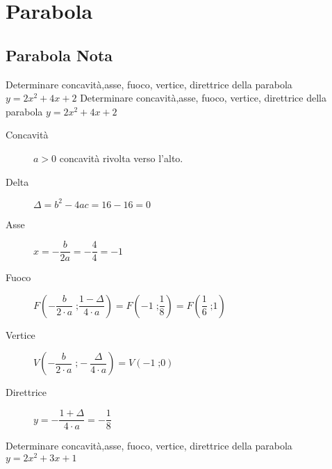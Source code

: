 \chapter{Parabola}
\section{Parabola Nota}
 \begin{exercise}
	Determinare concavità,asse, fuoco, vertice, direttrice della parabola $y=2x^2+4x+2$
	\tcblower
	Determinare concavità,asse, fuoco, vertice, direttrice della parabola $y=2x^2+4x+2$
	\begin{description}
		\item[Concavità] $a>0$ concavità rivolta verso l'alto.
		\item[Delta] $\Delta=b^2-4ac=16-16=0$
		\item[Asse] $x=-\dfrac{b}{2a}=-\dfrac{4}{4}=-1$
		\item[Fuoco] $F\left(-\dfrac{b}{2\cdot a}\;\text{;}\dfrac{1-\Delta}{4\cdot a}\right)=F\left(-1\;\text{;}\dfrac{1}{8}\right)=F\left(\dfrac{1}{6}\;\text{;} 1\right)$
		\item[Vertice] $V\left(-\dfrac{b}{2\cdot a}\;\text{;}-\dfrac{\Delta}{4\cdot a}\right)=V\left(-1\;\text{;}0\right)$
		\item[Direttrice] $y=-\dfrac{1+\Delta}{4\cdot a}=-\dfrac{1}{8}$
	\end{description}
\end{exercise}
\begin{exercise}[no solution]
	Determinare concavità,asse, fuoco, vertice, direttrice della parabola $y=2x^2+3x+1$
\end{exercise}

